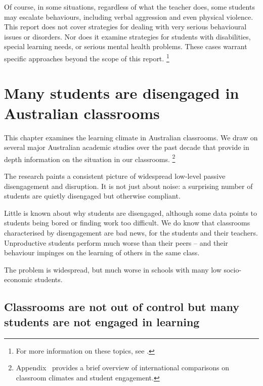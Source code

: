 \documentclass{grattan}
\begin{document}
Of course, in some situations, regardless of what the teacher does, some students may escalate behaviours, including verbal aggression and even physical violence. This report does not cover strategies for dealing with very serious behavioural issues or disorders. Nor does it examine strategies for students with disabilities, special learning needs, or serious mental health problems. These cases warrant specific approaches beyond the scope of this report.%
    \footnote{For more information on these topics, see \textcites{Friend2014IncludingStudentsSpecial}{Sutherland2008ExaminingInfluenceTeacher}{Walker1995AntisocialBehaviorSchool}.}


\chapter{Many students are disengaged in Australian classrooms }\label{chap:many-students-disengaged}

This chapter examines the learning climate in Australian classrooms. We draw on several major Australian academic studies over the past decade that provide in depth information on the situation in our classrooms.%
\footnote{Appendix~ provides a brief overview of international comparisons on classroom climates and student engagement.}

The research paints a consistent picture of widespread low-level passive disengagement and disruption. It is not just about noise: a surprising number of students are quietly disengaged but otherwise compliant.

Little is known about why students are disengaged, although some data points to students being bored or finding work too difficult. We do know that classrooms characterised by disengagement are bad news, for the students and their teachers. Unproductive students perform much worse than their peers -- and their behaviour impinges on the learning of others in the same class.

The problem is widespread, but much worse in schools with many low socio-economic students.

\section{Classrooms are not out of control but many students are not engaged in learning}\label{sec:not-out-of-control}
\end{document}
